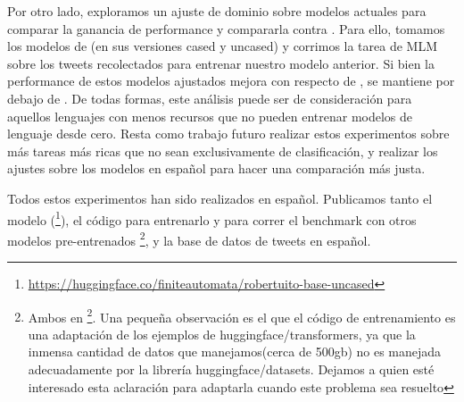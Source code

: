 Por otro lado, exploramos un ajuste de dominio sobre modelos actuales para comparar la ganancia de performance y compararla contra \robertuito{}. Para ello, tomamos los modelos de \beto{} (en sus versiones cased y uncased) y corrimos la tarea de MLM sobre los tweets recolectados para entrenar nuestro modelo anterior. Si bien la performance de estos modelos ajustados mejora con respecto de \beto{}, se mantiene por debajo de \robertuito{}. De todas formas, este análisis puede ser de consideración para aquellos lenguajes con menos recursos que no pueden entrenar modelos de lenguaje desde cero. Resta como trabajo futuro realizar estos experimentos sobre más tareas más ricas que no sean exclusivamente de clasificación, y realizar los ajustes sobre los modelos \roberta{} en español para hacer una comparación más justa.

Todos estos experimentos han sido realizados en español. Publicamos tanto el modelo \robertuito{}(\footnote{\url{https://huggingface.co/finiteautomata/robertuito-base-uncased}}), el código para entrenarlo y para correr el benchmark con otros modelos pre-entrenados \footnote{Ambos en  \footnote{\url{https://github.com/pysentimiento/robertuito}}. Una pequeña observación es el que el código de entrenamiento es una adaptación de los ejemplos de huggingface/transformers, ya que la inmensa cantidad de datos que manejamos(cerca de 500gb) no es manejada adecuadamente por la librería huggingface/datasets. Dejamos a quien esté interesado esta aclaración para adaptarla cuando este problema sea resuelto}, y la base de datos de tweets en español.
